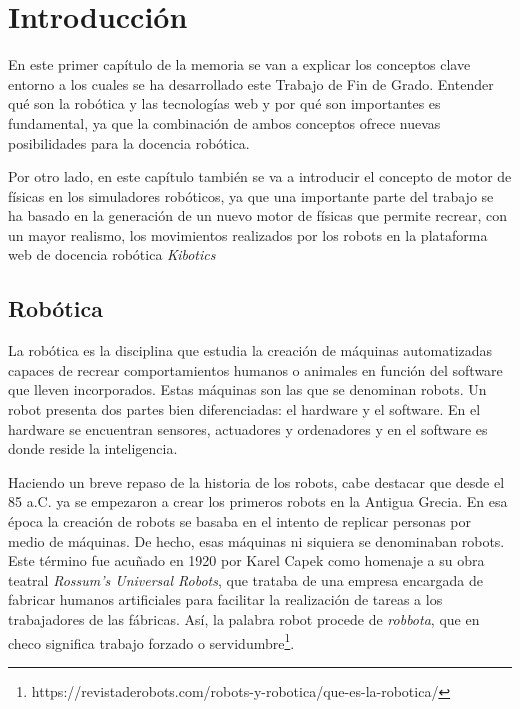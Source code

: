 \chapter{Introducción}
\label{chap:introduccion} 
En este primer capítulo de la memoria se van a explicar los conceptos clave entorno a los cuales se ha desarrollado este Trabajo de Fin de Grado. Entender qué son la robótica y las tecnologías web y por qué son importantes es fundamental, ya que la combinación de ambos conceptos ofrece nuevas posibilidades para la docencia robótica. \newline

Por otro lado, en este capítulo también se va a introducir el concepto de motor de físicas en los simuladores robóticos, ya que una importante parte del trabajo se ha basado en la generación de un nuevo motor de físicas que permite recrear, con un mayor realismo, los movimientos realizados por los robots en la plataforma web de docencia robótica \textit{Kibotics} \newline

\section{Robótica}
La robótica es la disciplina que estudia la creación de máquinas automatizadas capaces de recrear comportamientos humanos o animales en función del software que lleven incorporados. Estas máquinas son las que se denominan robots. Un robot presenta dos partes bien diferenciadas: el hardware y el software. En el hardware se encuentran sensores, actuadores y ordenadores y en el software es donde reside la inteligencia. \newline

Haciendo un breve repaso de la historia de los robots, cabe destacar que desde el 85 a.C. ya se empezaron a crear los primeros robots en la Antigua Grecia. En esa época la creación de robots se basaba en el intento de replicar personas por medio de máquinas. De hecho, esas máquinas ni siquiera se denominaban robots. Este término fue acuñado en 1920 por Karel Capek como homenaje a su obra teatral \textit{Rossum's Universal Robots}, que trataba de una empresa encargada de fabricar humanos artificiales para facilitar la realización de tareas a los trabajadores de las fábricas. Así, la palabra robot procede de \textit{robbota}, que en checo significa trabajo forzado o servidumbre\footnote{https://revistaderobots.com/robots-y-robotica/que-es-la-robotica/}. \newline

